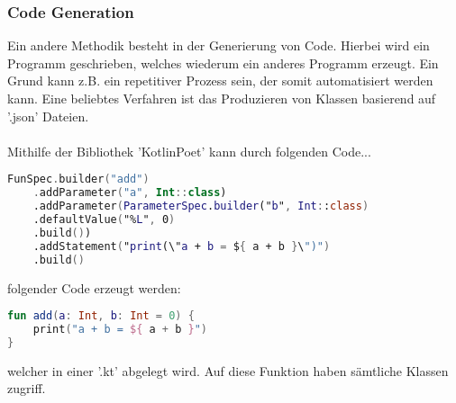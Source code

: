 \subsubsection{Code Generation}
Ein andere Methodik besteht in der Generierung von Code. Hierbei wird ein Programm geschrieben, welches wiederum ein anderes Programm erzeugt. Ein Grund kann z.B. ein repetitiver Prozess sein, der somit automatisiert werden kann. Eine beliebtes Verfahren ist das Produzieren von Klassen basierend auf '.json' Dateien.
\\
\\
Mithilfe der Bibliothek 'KotlinPoet' kann durch folgenden Code...
\begin{lstlisting}[caption={Code zum erezugen einer Funktion}, label={lst:data-class}, language=Kotlin]
FunSpec.builder("add")
	.addParameter("a", Int::class)
	.addParameter(ParameterSpec.builder("b", Int::class)
	.defaultValue("%L", 0)
	.build())
	.addStatement("print(\"a + b = ${ a + b }\")")
	.build()
\end{lstlisting}
\bigskip
folgender Code erzeugt werden:
\begin{lstlisting}[caption={Erzeugte Funktionen}, label={lst:data-class}, language=Kotlin]
fun add(a: Int, b: Int = 0) {
	print("a + b = ${ a + b }")
}
\end{lstlisting}
welcher in einer '.kt' abgelegt wird. Auf diese Funktion haben sämtliche Klassen zugriff.
